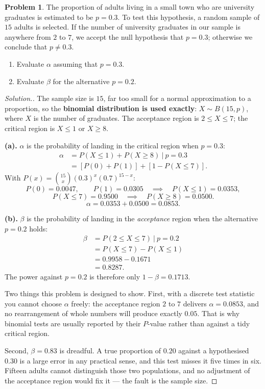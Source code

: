 \documentclass[11pt,a4paper]{article}
\theoremstyle{definition}
\newtheorem{problemx}{Problem}[section]
\newenvironment{problem}{\begin{problemx}}{\end{problemx}}
\newenvironment{solution}
  {\renewcommand{\qedsymbol}{}\begin{proof}[\textit{Solution}.]}
  {\end{proof}}
\begin{document}
\begin{problem}
The proportion of adults living in a small town who are university graduates is estimated to
be $p=0.3$. To test this hypothesis, a random sample of $15$ adults is selected. If the
number of university graduates in our sample is anywhere from $2$ to $7$, we accept the null
hypothesis that $p=0.3$; otherwise we conclude that $p\neq 0.3$.
\begin{enumerate}
\item[(a).] Evaluate $\alpha$ assuming that $p=0.3$.
\item[(b).] Evaluate $\beta$ for the alternative $p=0.2$.
\end{enumerate}
\end{problem}

\begin{solution}
The sample size is $15$, far too small for a normal approximation to a proportion, so the
\textbf{binomial distribution is used exactly}: $X\sim B(15,p)$, where $X$ is the number of
graduates. The acceptance region is $2\leq X\leq 7$; the critical region is
$X\leq 1$ or $X\geq 8$.

\textbf{(a).} $\alpha$ is the probability of landing in the critical region when $p=0.3$:
\begin{align*}
\alpha &=P(X\leq 1)+P(X\geq 8)\ |\ p=0.3\\
       &=[P(0)+P(1)]+[1-P(X\leq 7)].
\end{align*}
With $P(x)=\binom{15}{x}(0.3)^x(0.7)^{15-x}$:
\[P(0)=0.0047,\qquad P(1)=0.0305\quad\implies\quad P(X\leq 1)=0.0353,\]
\[P(X\leq 7)=0.9500\quad\implies\quad P(X\geq 8)=0.0500.\]
\[\alpha=0.0353+0.0500=0.0853.\]

\textbf{(b).} $\beta$ is the probability of landing in the \emph{acceptance} region when the
alternative $p=0.2$ holds:
\begin{align*}
\beta &=P(2\leq X\leq 7)\ |\ p=0.2\\
      &=P(X\leq 7)-P(X\leq 1)\\
      &=0.9958-0.1671\\
      &=0.8287.
\end{align*}
The power against $p=0.2$ is therefore only $1-\beta=0.1713$.

Two things this problem is designed to show. First, with a discrete test statistic you
cannot choose $\alpha$ freely: the acceptance region $2$ to $7$ delivers $\alpha=0.0853$,
and no rearrangement of whole numbers will produce exactly $0.05$. That is why binomial
tests are usually reported by their $P$-value rather than against a tidy critical region.

Second, $\beta=0.83$ is dreadful. A true proportion of $0.20$ against a hypothesised $0.30$
is a large error in any practical sense, and this test misses it five times in six. Fifteen
adults cannot distinguish those two populations, and no adjustment of the acceptance region
would fix it --- the fault is the sample size.
\end{solution}
\end{document}
